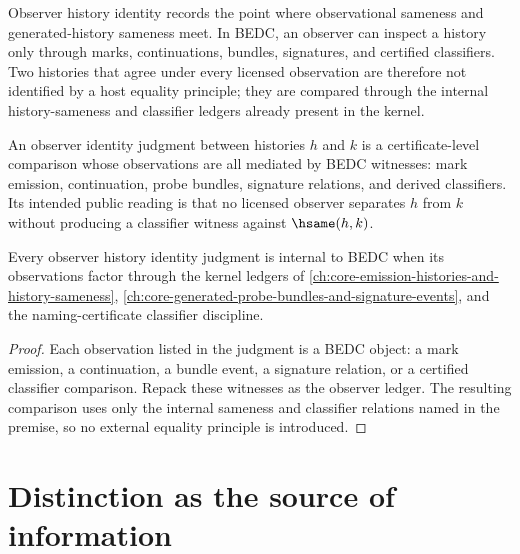 Observer history identity records the point where observational sameness and generated-history sameness meet. In BEDC, an observer can inspect a history only through marks, continuations, bundles, signatures, and certified classifiers. Two histories that agree under every licensed observation are therefore not identified by a host equality principle; they are compared through the internal history-sameness and classifier ledgers already present in the kernel.

\begin{definition}
\label{def:observer-hist-identity}
An observer identity judgment between histories \(h\) and \(k\) is a certificate-level comparison whose observations are all mediated by BEDC witnesses: mark emission, continuation, probe bundles, signature relations, and derived classifiers. Its intended public reading is that no licensed observer separates \(h\) from \(k\) without producing a classifier witness against \(\hsame(h,k)\).
\end{definition}

\begin{theorem}
\label{thm:observer-hist-identity-internal}
Every observer history identity judgment is internal to BEDC when its observations factor through the kernel ledgers of \autoref{ch:core-emission-histories-and-history-sameness}, \autoref{ch:core-generated-probe-bundles-and-signature-events}, and the naming-certificate classifier discipline.
\end{theorem}
\begin{proof}
Each observation listed in the judgment is a BEDC object: a mark emission, a continuation, a bundle event, a signature relation, or a certified classifier comparison. Repack these witnesses as the observer ledger. The resulting comparison uses only the internal sameness and classifier relations named in the premise, so no external equality principle is introduced.
\end{proof}

\section{Distinction as the source of information}
\label{sec:observer-distinction-source}

